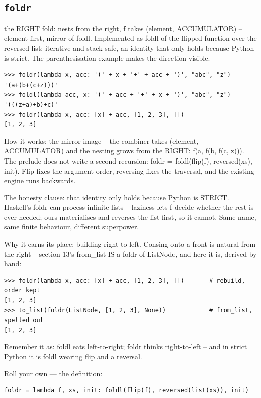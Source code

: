 \documentclass[10pt,letterpaper]{book}
\begin{document}
\subsection{\texttt{foldr}}\label{def:foldr}
the RIGHT fold: nests from the right, f takes (element, ACCUMULATOR) -- element first, mirror of foldl. Implemented as foldl of the flipped function over the reversed list: iterative and stack-safe, an identity that only holds because Python is strict. The parenthesisation example makes the direction visible.
\begin{lstlisting}[style=ex]
>>> foldr(lambda x, acc: '(' + x + '+' + acc + ')', "abc", "z")
'(a+(b+(c+z)))'
>>> foldl(lambda acc, x: '(' + acc + '+' + x + ')', "abc", "z")
'(((z+a)+b)+c)'
>>> foldr(lambda x, acc: [x] + acc, [1, 2, 3], [])
[1, 2, 3]
\end{lstlisting}

How it works: the mirror image -- the combiner takes (element, ACCUMULATOR) and the nesting grows from the RIGHT: f(a, f(b, f(c, z))). The prelude does not write a second recursion: foldr = foldl(flip(f), reversed(xs), init). Flip fixes the argument order, reversing fixes the traversal, and the existing engine runs backwards.


The honesty clause: that identity only holds because Python is STRICT. Haskell's foldr can process infinite lists -- laziness lets f decide whether the rest is ever needed; ours materialises and reverses the list first, so it cannot. Same name, same finite behaviour, different superpower.


Why it earns its place: building right-to-left. Consing onto a front is natural from the right -- section 13's from\_list IS a foldr of ListNode, and here it is, derived by hand:

\begin{lstlisting}[style=ex]
>>> foldr(lambda x, acc: [x] + acc, [1, 2, 3], [])       # rebuild, order kept
[1, 2, 3]
>>> to_list(foldr(ListNode, [1, 2, 3], None))            # from_list, spelled out
[1, 2, 3]
\end{lstlisting}

Remember it as: foldl eats left-to-right; foldr thinks right-to-left -- and in strict Python it is foldl wearing flip and a reversal.


Roll your own --- the definition:

\begin{lstlisting}[style=ex]
foldr = lambda f, xs, init: foldl(flip(f), reversed(list(xs)), init)
\end{lstlisting}
\end{document}
